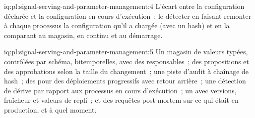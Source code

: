 \begin{solution}{iq:pl:signal-serving-and-parameter-management:4}
L'écart entre la configuration déclarée et la configuration en cours d'exécution~; le détecter en faisant remonter à chaque processus la configuration qu'il a chargée (avec un
hash) et en la comparant au magasin, en continu et au démarrage.
\end{solution}

\begin{solution}{iq:pl:signal-serving-and-parameter-management:5}
Un magasin de valeurs typées, contrôlées par schéma, bitemporelles, avec des responsables~; des propositions et des approbations selon la taille du changement~; une piste d'audit à chaînage de hash~; des  pour
des déploiements progressifs avec retour arrière~; une détection de dérive par rapport aux processus en cours d'exécution~; un  avec versions, fraîcheur et valeurs de repli~; et
des requêtes post-mortem sur ce qui était en production, et à quel moment.
\end{solution}
